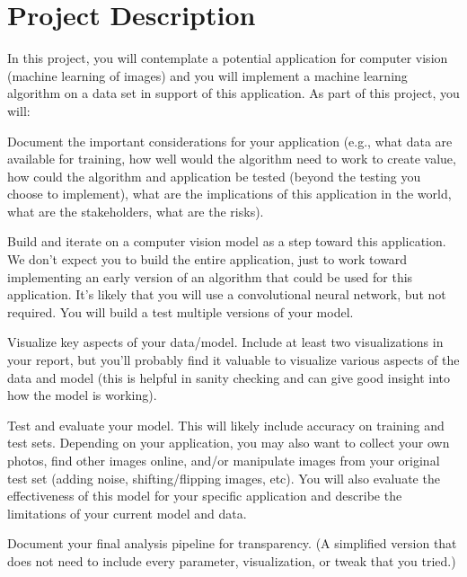 \documentclass{tufte-handout}
\begin{document}
\section*{Project Description}
In this project, you will contemplate a potential application for computer vision (machine learning of images) and you will implement a machine learning algorithm on a data set in support of this application. As part of this project, you will:
\bi[leftmargin=.5in]
\item Document the important considerations for your application (e.g., what data are available for training, how well would the algorithm need to work to create value, how could the algorithm and application be tested (beyond the testing you choose to implement), what are the implications of this application in the world, what are the stakeholders, what are the risks). 
\item Build and iterate on a computer vision model as a step toward this application. We don’t expect you to build the entire application, just to work toward implementing an early version of an algorithm that could be used for this application. It’s likely that you will use a convolutional neural network, but not required. You will build a test multiple versions of your model.
\item Visualize key aspects of your data/model. Include at least two visualizations in your report, but you’ll probably find it valuable to visualize various aspects of the data and model (this is helpful in sanity checking and can give good insight into how the model is working). 
\item Test and evaluate your model. This will likely include accuracy on training and test sets. Depending on your application, you may also want to collect your own photos, find other images online, and/or manipulate images from your original test set (adding noise, shifting/flipping images, etc). You will also evaluate the effectiveness of this model for your specific application and describe the limitations of your current model and data.
\item Document your final analysis pipeline for transparency. (A simplified version that does not need to include every parameter, visualization, or tweak that you tried.)
\ei
\end{document}
